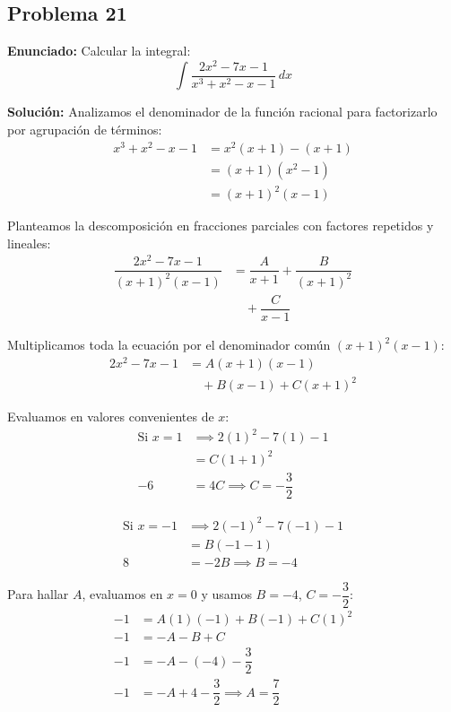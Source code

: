 \subsection*{Problema 21}
\textbf{Enunciado:} Calcular la integral:
\begin{equation*}
\int \dfrac{2x^2 - 7x - 1}{x^3 + x^2 - x - 1} \, dx
\end{equation*}

\textbf{Solución:} Analizamos el denominador
de la función racional para factorizarlo
por agrupación de términos:
\begin{align*}
x^3 + x^2 - x - 1 &= x^2(x + 1) - (x + 1) \\
&= (x + 1)(x^2 - 1) \\
&= (x + 1)^2(x - 1)
\end{align*}

Planteamos la descomposición en
fracciones parciales con factores
repetidos y lineales:
\begin{align*}
\dfrac{2x^2 - 7x - 1}{(x+1)^2(x-1)} &= 
\dfrac{A}{x+1} + \dfrac{B}{(x+1)^2} \\
&\quad + \dfrac{C}{x-1}
\end{align*}

Multiplicamos toda la ecuación por
el denominador común $(x+1)^2(x-1)$:
\begin{align*}
2x^2 - 7x - 1 &= A(x+1)(x-1) \\
&\quad + B(x-1) + C(x+1)^2
\end{align*}

Evaluamos en valores convenientes de $x$:
\begin{align*}
\text{Si } x = 1 &\implies 2(1)^2 - 7(1) - 1 \\
&= C(1+1)^2 \\
-6 &= 4C \implies C = -\dfrac{3}{2}
\end{align*}

\begin{align*}
\text{Si } x = -1 &\implies 2(-1)^2 - 7(-1) - 1 \\
&= B(-1-1) \\
8 &= -2B \implies B = -4
\end{align*}

Para hallar $A$, evaluamos en $x = 0$
y usamos $B = -4$, $C = -\dfrac{3}{2}$:
\begin{align*}
-1 &= A(1)(-1) + B(-1) + C(1)^2 \\
-1 &= -A - B + C \\
-1 &= -A - (-4) - \dfrac{3}{2} \\
-1 &= -A + 4 - \dfrac{3}{2} \implies A = \dfrac{7}{2}
\end{align*}

